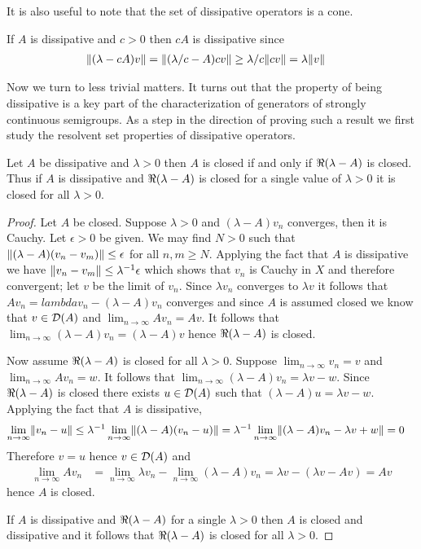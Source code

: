 It is also useful to note that the set of dissipative operators is a cone.
\begin{examp}\label{DissipativeOperatorsCone}
If $A$ is dissipative and $c > 0$ then $c A$ is dissipative since 
\begin{align*}
\lVert (\lambda - c A) v \rVert &= \lVert (\lambda/c - A) c v \rVert \geq \lambda/c \lVert cv \rVert = \lambda \lVert v \rVert
\end{align*}
\end{examp}

Now we turn to less trivial matters.  It turns out that the property of being dissipative is a key part of the characterization of generators of strongly continuous semigroups.  As a step in the direction of proving such a result we first study the resolvent set properties of dissipative operators.

\begin{prop}\label{DissipativeAndClosed}Let $A$ be dissipative and $\lambda > 0$ then $A$ is closed if and only if $\Re(\lambda - A)$ is closed.  Thus if $A$ is dissipative and $\Re(\lambda - A)$ is closed for a single value of $\lambda > 0$ it is closed for all $\lambda > 0$.
\end{prop}
\begin{proof}
Let $A$ be closed.  Suppose $\lambda>0$ and $(\lambda -A) v_n$ converges, then it is Cauchy.  Let $\epsilon > 0$ be given.  We may find $N > 0$ such that $\lVert (\lambda -A)(v_n-v_m) \rVert \leq \epsilon$ for all $n,m \geq N$.  Applying the fact that $A$ is dissipative we have $\lVert v_n - v_m \rVert \leq \lambda^{-1} \epsilon$ which shows that $v_n$ is Cauchy in $X$ and therefore convergent; let $v$ be the limit of $v_n$.  Since $\lambda v_n$ converges to $\lambda v$ it follows that $A v_n = lambda v_n - (\lambda -A) v_n$ converges and since $A$
is assumed closed we know that $v \in \mathcal{D}(A)$ and $\lim_{n \to \infty} A v_n = A v$.  It follows that $\lim_{n \to \infty} (\lambda -A)v_n  = (\lambda -A)v$ hence $\Re(\lambda - A)$ is closed.

Now assume $\Re(\lambda - A)$ is closed for all $\lambda > 0$.  Suppose $\lim_{n \to \infty} v_n = v$ and $\lim_{n \to \infty} A v_n = w$.  It follows that $\lim_{n \to \infty} (\lambda - A) v_n = \lambda v - w$.  Since $\Re(\lambda - A)$ is closed there exists $u \in \mathcal{D}(A)$ such that $(\lambda - A) u = \lambda v - w$.  Applying the fact that $A$ is dissipative,
\begin{align*}
\lim_{n \to \infty} \lVert v_n - u \rVert &\leq \lambda^{-1}\lim_{n \to \infty} \lVert (\lambda - A)(v_n - u) \rVert = \lambda^{-1}\lim_{n \to \infty} \lVert (\lambda - A)v_n - \lambda v + w \rVert = 0
\end{align*}
Therefore $v = u$ hence $v \in \mathcal{D}(A)$ and 
\begin{align*}
\lim_{n \to \infty} A v_n &= \lim_{n \to \infty} \lambda v_n - \lim_{n \to \infty} (\lambda -A) v_n = \lambda v - (\lambda v - A v) = Av
\end{align*}
hence $A$ is closed.

If $A$ is dissipative and $\Re(\lambda - A)$ for a single $\lambda>0$ then $A$ is closed and dissipative and it follows that $\Re(\lambda - A)$ is closed for all $\lambda > 0$.
\end{proof}


